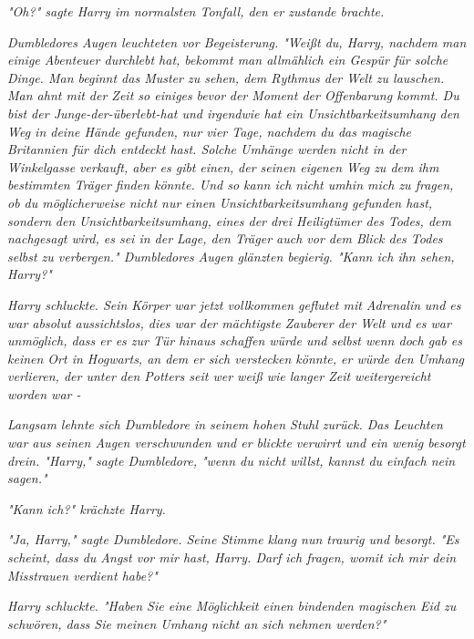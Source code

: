 {\emph{"Oh?" sagte Harry im normalsten Tonfall, den er zustande brachte.}

\emph{Dumbledores Augen leuchteten vor Begeisterung. "Weißt du, Harry, nachdem man einige Abenteuer durchlebt hat, bekommt man allmählich ein Gespür für solche Dinge. Man beginnt das Muster zu sehen, dem Rythmus der Welt zu lauschen. Man ahnt mit der Zeit so einiges} \emph{\emph{bevor}} \emph{der Moment der Offenbarung kommt. Du bist der Junge-der-überlebt-hat und irgendwie hat ein Unsichtbarkeitsumhang den Weg in deine Hände gefunden, nur vier Tage, nachdem du das magische Britannien für dich entdeckt hast. Solche Umhänge werden nicht in der Winkelgasse verkauft, aber es gibt} \emph{\emph{einen,}} \emph{der seinen eigenen Weg zu dem ihm bestimmten Träger finden könnte. Und so kann ich nicht umhin mich zu fragen, ob du möglicherweise nicht nur} \emph{\emph{einen}} \emph{Unsichtbarkeitsumhang gefunden hast, sondern} \emph{\emph{den}} \emph{Unsichtbarkeitsumhang, eines der drei Heiligtümer des Todes, dem nachgesagt wird, es sei in der Lage, den Träger auch vor dem Blick des Todes selbst zu verbergen." Dumbledores Augen glänzten begierig. "Kann ich ihn sehen, Harry?"}

\emph{Harry schluckte. Sein Körper war jetzt vollkommen geflutet mit Adrenalin} \emph{und es war absolut aussichtslos, dies war der mächtigste Zauberer der Welt und es war unmöglich, dass er es zur Tür hinaus schaffen würde und selbst wenn doch gab es keinen Ort in Hogwarts, an dem er sich verstecken könnte, er würde den Umhang verlieren, der unter den Potters seit wer weiß wie langer Zeit weitergereicht worden war -}

\emph{Langsam lehnte sich Dumbledore in seinem hohen Stuhl zurück. Das Leuchten war aus seinen Augen verschwunden und er blickte verwirrt und ein wenig besorgt drein. "Harry," sagte Dumbledore, "wenn du nicht willst, kannst du einfach nein sagen."}

\emph{"Kann ich?" krächzte Harry.}

\emph{"Ja, Harry," sagte Dumbledore. Seine Stimme klang nun traurig und besorgt. "Es scheint, dass du Angst vor mir hast, Harry. Darf ich fragen, womit ich mir dein Misstrauen verdient habe?"}

\emph{Harry schluckte. "Haben Sie eine Möglichkeit einen bindenden magischen Eid zu schwören, dass Sie meinen Umhang nicht an sich nehmen werden?"}

}
